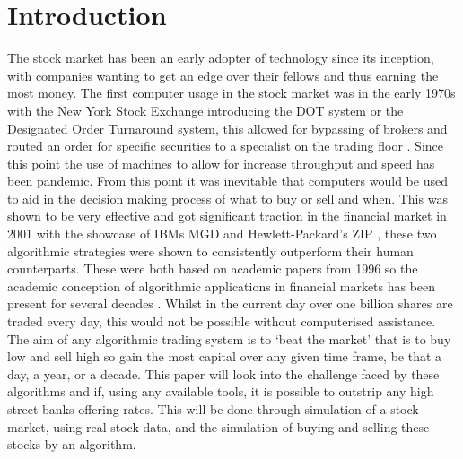 \documentclass[12pt,a4paper]{article}
\begin{document}
\section{Introduction}

\iffalse
This section briefly introduces the general project background, the research question you are addressing, and the project objectives.  It should be between 2 to 3 pages in length.  Do not change the font sizes or line spacing in order to put in more text.

- Same as the aims just longer.\\
- What is the aim for a year?\\
- Objectives.\\
- What is the state of the art in the field?\\
- A bit of the history of trading.\\
\fi

The stock market has been an early adopter of technology since its inception, with companies wanting to get an edge over their fellows and thus earning the most money. The first computer usage in the stock market was in the early 1970s with the New York Stock Exchange introducing the DOT system or the Designated Order Turnaround system, this allowed for bypassing of brokers and routed an order for specific securities to a specialist on the trading floor \cite{Hasbrouck}. Since this point the use of machines to allow for increase throughput and speed has been pandemic. From this point it was inevitable that computers would be used to aid in the decision making process of what to buy or sell and when. This was shown to be very effective and got significant traction in the financial market in 2001 with the showcase of IBMs MGD and  Hewlett-Packard's ZIP \cite{tesauro}, these two algorithmic strategies were shown to consistently outperform their human counterparts. These were both based on academic papers from 1996 so the academic conception of algorithmic applications in financial markets has been present for several decades\cite{Gjerstad} \cite{Cliff}. Whilst in the current day over one billion shares are traded every day, this would not be possible without computerised assistance. \\

The aim of any algorithmic trading system is to `beat the market' that is to buy low and sell high so gain the most capital over any given time frame, be that a day, a year, or a decade. This paper will look into the challenge faced by these algorithms and if, using any available tools, it is possible to outstrip any high street banks offering rates. This will be done through simulation of a stock market, using real stock data, and the simulation of buying and selling these stocks by an algorithm.\\
\end{document}
